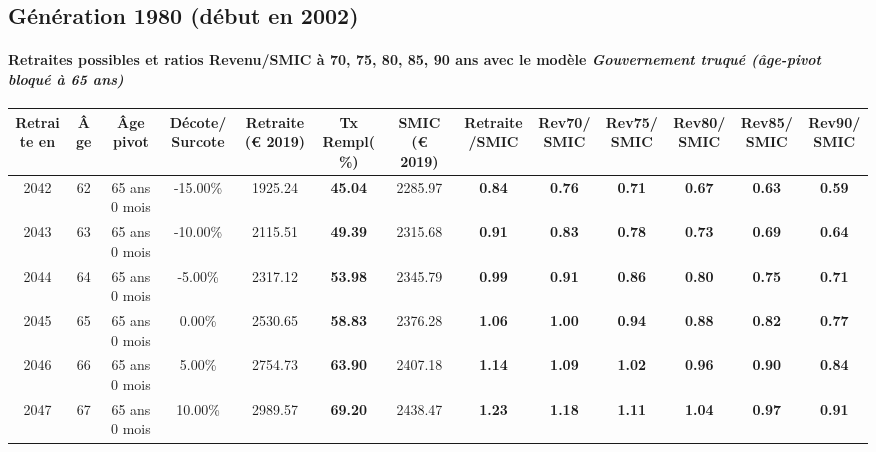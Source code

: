 \newpage 
 
\subsection{Génération 1980 (début en 2002)} 

\paragraph{Retraites possibles et ratios Revenu/SMIC à 70, 75, 80, 85, 90 ans avec le modèle \emph{Gouvernement truqué (âge-pivot bloqué à 65 ans)}}  
 
{ \scriptsize \begin{center} 
\begin{tabular}[htb]{|c|c||c|c||c|c||c||c|c|c|c|c|c|} 
\hline 
 Retraite en &  Âge &  Âge pivot &  Décote/Surcote &  Retraite (\euro{} 2019) &  Tx Rempl(\%) &  SMIC (\euro{} 2019) &  Retraite/SMIC &  Rev70/SMIC &  Rev75/SMIC &  Rev80/SMIC &  Rev85/SMIC &  Rev90/SMIC \\ 
\hline \hline 
 2042 &  62 &  65 ans 0 mois &  -15.00\% &  1925.24 &  {\bf 45.04} &  2285.97 &  {\bf {\color{red} 0.84}} &  {\bf {\color{red} 0.76}} &  {\bf {\color{red} 0.71}} &  {\bf {\color{red} 0.67}} &  {\bf {\color{red} 0.63}} &  {\bf {\color{red} 0.59}} \\ 
\hline 
 2043 &  63 &  65 ans 0 mois &  -10.00\% &  2115.51 &  {\bf 49.39} &  2315.68 &  {\bf {\color{red} 0.91}} &  {\bf {\color{red} 0.83}} &  {\bf {\color{red} 0.78}} &  {\bf {\color{red} 0.73}} &  {\bf {\color{red} 0.69}} &  {\bf {\color{red} 0.64}} \\ 
\hline 
 2044 &  64 &  65 ans 0 mois &  -5.00\% &  2317.12 &  {\bf 53.98} &  2345.79 &  {\bf {\color{red} 0.99}} &  {\bf {\color{red} 0.91}} &  {\bf {\color{red} 0.86}} &  {\bf {\color{red} 0.80}} &  {\bf {\color{red} 0.75}} &  {\bf {\color{red} 0.71}} \\ 
\hline 
 2045 &  65 &  65 ans 0 mois &  0.00\% &  2530.65 &  {\bf 58.83} &  2376.28 &  {\bf 1.06} &  {\bf {\color{red} 1.00}} &  {\bf {\color{red} 0.94}} &  {\bf {\color{red} 0.88}} &  {\bf {\color{red} 0.82}} &  {\bf {\color{red} 0.77}} \\ 
\hline 
 2046 &  66 &  65 ans 0 mois &  5.00\% &  2754.73 &  {\bf 63.90} &  2407.18 &  {\bf 1.14} &  {\bf 1.09} &  {\bf 1.02} &  {\bf {\color{red} 0.96}} &  {\bf {\color{red} 0.90}} &  {\bf {\color{red} 0.84}} \\ 
\hline 
 2047 &  67 &  65 ans 0 mois &  10.00\% &  2989.57 &  {\bf 69.20} &  2438.47 &  {\bf 1.23} &  {\bf 1.18} &  {\bf 1.11} &  {\bf 1.04} &  {\bf {\color{red} 0.97}} &  {\bf {\color{red} 0.91}} \\ 
\hline 
\hline 
\end{tabular} 
\end{center} } 
